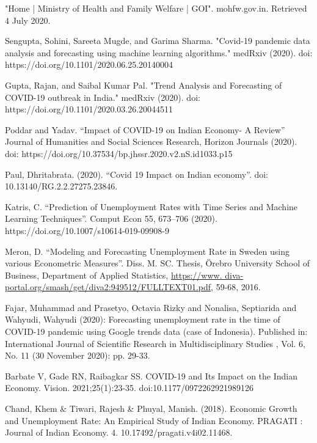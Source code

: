 \documentclass[times,twocolumn,final,authoryear]{elsarticle}
\begin{document}
	\begin{thebibliography}{1}
		
		"Home | Ministry of Health and Family Welfare | GOI". mohfw.gov.in. Retrieved 4 July 2020.
		
		Sengupta, Sohini, Sareeta Mugde, and Garima Sharma. "Covid-19 pandemic data analysis and forecasting using machine learning algorithms." medRxiv (2020). doi: https://doi.org/10.1101/2020.06.25.20140004
		
		Gupta, Rajan, and Saibal Kumar Pal. "Trend Analysis and Forecasting of COVID-19 outbreak in India." medRxiv (2020). doi: https://doi.org/10.1101/2020.03.26.20044511
		
		Poddar and Yadav. “Impact of COVID-19 on Indian Economy- A Review” Journal of Humanities and Social Sciences Research, Horizon Journals (2020). doi: https://doi.org/10.37534/bp.jhssr.2020.v2.nS.id1033.p15
		
		Paul, Dhritabrata. (2020). “Covid 19 Impact on Indian economy”. doi: 10.13140/RG.2.2.27275.23846.
		
		Katris, C. “Prediction of Unemployment Rates with Time Series and Machine Learning Techniques”. Comput Econ 55, 673–706 (2020). https://doi.org/10.1007/s10614-019-09908-9
		
		Meron, D. “Modeling and Forecasting Unemployment Rate in Sweden using various Econometric Measures”. Diss. M. SC. Thesis, Örebro University School of Business, Department of Applied Statistics, \url{https://www. diva-portal.org/smash/get/diva2:949512/FULLTEXT01.pdf}, 59-68, 2016.
		
		Fajar, Muhammad and Prasetyo, Octavia Rizky and Nonalisa, Septiarida and Wahyudi, Wahyudi (2020): Forecasting unemployment rate in the time of COVID-19 pandemic using Google trends data (case of Indonesia). Published in: International Journal of Scientific Research in Multidisciplinary Studies , Vol. 6, No. 11 (30 November 2020): pp. 29-33.
		
		Barbate V, Gade RN, Raibagkar SS. COVID-19 and Its Impact on the Indian Economy. Vision. 2021;25(1):23-35. doi:10.1177/0972262921989126
		
		Chand, Khem \& Tiwari, Rajesh \& Phuyal, Manish. (2018). Economic Growth and Unemployment Rate: An Empirical Study of Indian Economy. PRAGATI : Journal of Indian Economy. 4. 10.17492/pragati.v4i02.11468. 
		

\end{thebibliography}
\end{document}
